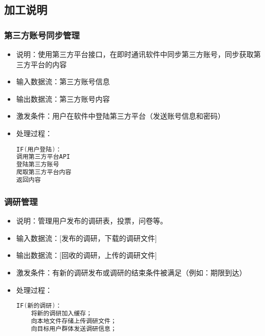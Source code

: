         \subsection{\color{red} 加工说明}
        {\color{red}
        \subsubsection{\color{red} 第三方账号同步管理}
        \begin{itemize}
            \item 说明：使用第三方平台接口，在即时通讯软件中同步第三方账号，同步获取第三方平台的内容
            \item 输入数据流：第三方账号信息
            \item 输出数据流：第三方账号内容
            \item 激发条件：用户在软件中登陆第三方平台（发送账号信息和密码）
            \item 处理过程：
\begin{lstlisting}[language=C, caption=错误信息处理单元, label={code:first-code}]
IF(用户登陆)：
调用第三方平台API
登陆第三方账号
爬取第三方平台内容
返回内容
\end{lstlisting}
        \end{itemize}

\subsubsection{\color{red} 调研管理}
        \begin{itemize}
            \item 说明：管理用户发布的调研表，投票，问卷等。
            \item 输入数据流：[发布的调研，下载的调研文件]
            \item 输出数据流：[回收的调研，上传的调研文件]
            \item 激发条件：有新的调研发布或调研的结束条件被满足（例如：期限到达）
            \item 处理过程：
\begin{lstlisting}[language=C, caption=错误信息处理单元, label={code:first-code}]
IF(新的调研)：
    将新的调研加入缓存；
    向本地文件存储上传调研文件；
    向目标用户群体发送调研信息；


\end{lstlisting}
\end{itemize}}
